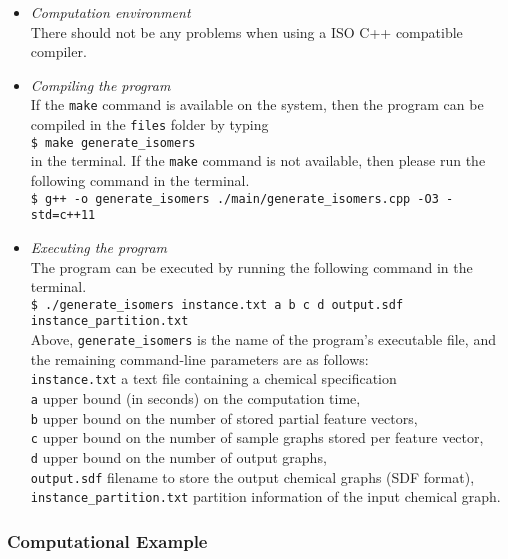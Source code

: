 \documentclass[11pt,titlepage,dvipdfmx,twoside]{article}
\begin{document}
\begin{itemize}
	\item {\em Computation environment}\\
		There should not be any problems when using a ISO C++ compatible compiler. %
	\item {\em Compiling the program}\\
		If the {\tt make} command is available on the system, 
		then the program can be compiled in the {\tt files} folder by typing \\
		\verb|$ make generate_isomers|\\
		in the terminal.
		If the {\tt make} command is not available, then
		please run the following command in the terminal.\\
		\verb|$ g++ -o generate_isomers ./main/generate_isomers.cpp -O3 -std=c++11|\\
	\item {\em Executing the program}\\
		The program can be executed by running the following command in the terminal.\\
		\verb|$ ./generate_isomers instance.txt a b c d output.sdf instance_partition.txt|\\
		Above, {\tt generate\_isomers} is the name of the program's executable file, and the remaining command-line
		parameters are as follows: \\
		\verb|instance.txt|  a text file containing a chemical specification \\
		\verb|a| upper bound (in seconds) on the computation time, \\
		\verb|b| upper bound on the number of stored partial feature vectors, \\
		\verb|c| upper bound on the number of sample graphs stored per feature vector, \\
		\verb|d| upper bound on the number of output graphs, \\
		\verb|output.sdf| filename to store the output chemical graphs (SDF format), \\
		\verb|instance_partition.txt|  partition information of the input chemical graph.
\end{itemize}


\subsubsection{Computational Example}
\label{sec:instance_p}
\end{document}

